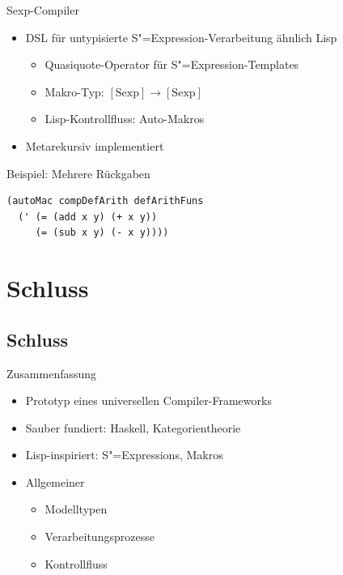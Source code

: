 \documentclass{beamer}
\newcommand\ato{\rightarrow} %
\newcommand{\sexp}{S"=Expression}
\newcommand{\sexps}{S"=Expressions}
\begin{document}
\begin{frame}[fragile]{Sexp-Compiler}
  \begin{itemize}
  \item DSL für untypisierte \sexp{}-Verarbeitung ähnlich Lisp
    \begin{itemize}
    \item Quasiquote-Operator für \sexp{}-Templates
    \item Makro-Typ: $\mathrm{[Sexp]} \ato \mathrm{[Sexp]}$
    \item Lisp-Kontrollfluss: Auto-Makros
    \end{itemize}
  \item Metarekursiv implementiert
  \end{itemize}
  \begin{block}{Beispiel: Mehrere Rückgaben}
\begin{verbatim}
(autoMac compDefArith defArithFuns
  (' (= (add x y) (+ x y))
     (= (sub x y) (- x y))))
\end{verbatim}
  \end{block}
\end{frame}

\section{Schluss}
\subsection{Schluss}

\begin{frame}{Zusammenfassung}
  \begin{itemize}
  \item Prototyp eines universellen Compiler-Frameworks
  \item Sauber fundiert: Haskell, Kategorientheorie
  \item Lisp-inspiriert: \sexps{}, Makros
  \item Allgemeiner
    \begin{itemize}
    \item Modelltypen
    \item Verarbeitungsprozesse
    \item Kontrollfluss
    \end{itemize}
  \end{itemize}
\end{frame}
\end{document}
